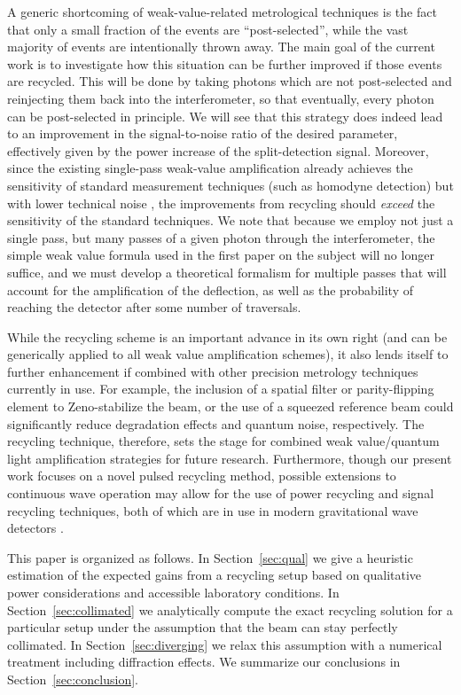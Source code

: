 A generic shortcoming of weak-value-related metrological techniques is the fact that only a small fraction of the events are ``post-selected'', while the vast majority of events are intentionally thrown away.  The main goal of the current work is to investigate how this situation can be further improved if those events are recycled.  This will be done by taking photons which are not post-selected and reinjecting them back into the interferometer, so that eventually, every photon can be post-selected in principle.  We will see that this strategy does indeed lead to an improvement in the signal-to-noise ratio of the desired parameter, effectively given by the power increase of the split-detection signal.  Moreover, since the existing single-pass weak-value amplification already achieves the sensitivity of standard measurement techniques (such as homodyne detection) but with lower technical noise \cite{Starling2009}, the improvements from recycling should \emph{exceed} the sensitivity of the standard techniques.  We note that because we employ not just a single pass, but many passes of a given photon through the interferometer, the simple weak value formula used in the first paper on the subject \cite{Dixon2009} will no longer suffice, and we must develop a theoretical formalism for multiple passes that will account for the amplification of the deflection, as well as the probability of reaching the detector after some number of traversals.

While the recycling scheme is an important advance in its own right (and can be generically applied to all weak value amplification schemes), it also lends itself to further enhancement if combined with other precision metrology techniques currently in use.  For example, the inclusion of a spatial filter or parity-flipping element to Zeno-stabilize the beam, or the use of a squeezed reference beam \cite{Caves1981,Barnett2003,Treps2002,Treps2003} could significantly reduce degradation effects and quantum noise, respectively.  The recycling technique, therefore, sets the stage for combined weak value/quantum light amplification strategies for future research.  Furthermore, though our present work focuses on a novel pulsed recycling method, possible extensions to continuous wave operation may allow for the use of power recycling \cite{Drever1983} and signal recycling \cite{Meers1991} techniques, both of which are in use in modern gravitational wave detectors \cite{Schnier1997,Vahlbruch2005}. 

This paper is organized as follows.  In Section~\ref{sec:qual} we give a heuristic estimation of the expected gains from a recycling setup based on qualitative power considerations and accessible laboratory conditions.  In Section~\ref{sec:collimated} we analytically compute the exact recycling solution for a particular setup under the assumption that the beam can stay perfectly collimated.  In Section~\ref{sec:diverging} we relax this assumption with a numerical treatment including diffraction effects.  We summarize our conclusions in Section~\ref{sec:conclusion}.

